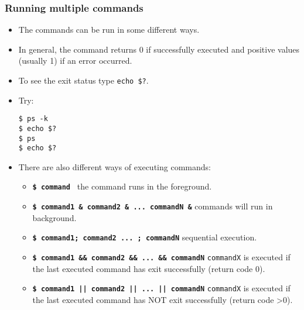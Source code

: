 \begin{frame}\frametitle{Running multiple commands}
\begin{itemize}
\item The commands can be run in some different ways. 
\item In general, the command returns 0 if
successfully executed and positive values (usually 1) if an error occurred.
\item To see the exit status type \texttt{echo \$?}. 
\item Try:

\begin{lstlisting}
$ ps -k
$ echo $?
$ ps 
$ echo $?
\end{lstlisting}

\framebreak
\item There are also different ways of executing commands:
  \begin{itemize}
  \item \textbf{\texttt{\$~command~}} the command runs in the foreground. 
  \item \textbf{\texttt{\$~command1~\&~command2~\&~...~commandN~\&}} commands will run in background.
  \item \textbf{\texttt{\$~command1;~command2~... ;~commandN}} sequential execution.
  \item \textbf{\texttt{\$~command1~\&\&~command2~\&\&~...~\&\&~commandN}} \texttt{commandX} is executed
  if the last executed command has exit successfully (return code 0).
  \item \textbf{\texttt{\$~command1~||~command2~||~...~||~commandN}} \texttt{commandX} is executed
  if the last executed command has NOT exit successfully (return code >0).
  \end{itemize}
\end{itemize}
\end{frame}